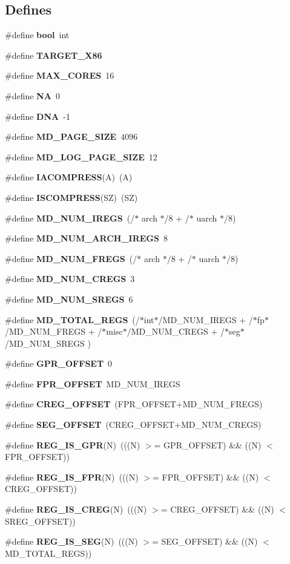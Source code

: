 \subsection*{Defines}
\begin{CompactItemize}
\item 
\#define {\bf bool}~int
\item 
\#define {\bf TARGET\_\-X86}
\item 
\#define {\bf MAX\_\-CORES}~16
\item 
\#define {\bf NA}~0
\item 
\#define {\bf DNA}~-1
\item 
\#define {\bf MD\_\-PAGE\_\-SIZE}~4096
\item 
\#define {\bf MD\_\-LOG\_\-PAGE\_\-SIZE}~12
\item 
\#define {\bf IACOMPRESS}(A)~(A)
\item 
\#define {\bf ISCOMPRESS}(SZ)~(SZ)
\item 
\#define {\bf MD\_\-NUM\_\-IREGS}~(/$\ast$ arch $\ast$/8 + /$\ast$ uarch $\ast$/8)
\item 
\#define {\bf MD\_\-NUM\_\-ARCH\_\-IREGS}~8
\item 
\#define {\bf MD\_\-NUM\_\-FREGS}~(/$\ast$ arch $\ast$/8 + /$\ast$ uarch $\ast$/8)
\item 
\#define {\bf MD\_\-NUM\_\-CREGS}~3
\item 
\#define {\bf MD\_\-NUM\_\-SREGS}~6
\item 
\#define {\bf MD\_\-TOTAL\_\-REGS}~(/$\ast$int$\ast$/MD\_\-NUM\_\-IREGS + /$\ast$fp$\ast$/MD\_\-NUM\_\-FREGS + /$\ast$misc$\ast$/MD\_\-NUM\_\-CREGS + /$\ast$seg$\ast$/MD\_\-NUM\_\-SREGS )
\item 
\#define {\bf GPR\_\-OFFSET}~0
\item 
\#define {\bf FPR\_\-OFFSET}~MD\_\-NUM\_\-IREGS
\item 
\#define {\bf CREG\_\-OFFSET}~(FPR\_\-OFFSET+MD\_\-NUM\_\-FREGS)
\item 
\#define {\bf SEG\_\-OFFSET}~(CREG\_\-OFFSET+MD\_\-NUM\_\-CREGS)
\item 
\#define {\bf REG\_\-IS\_\-GPR}(N)~(((N) $>$= GPR\_\-OFFSET) \&\& ((N) $<$ FPR\_\-OFFSET))
\item 
\#define {\bf REG\_\-IS\_\-FPR}(N)~(((N) $>$= FPR\_\-OFFSET) \&\& ((N) $<$ CREG\_\-OFFSET))
\item 
\#define {\bf REG\_\-IS\_\-CREG}(N)~(((N) $>$= CREG\_\-OFFSET) \&\& ((N) $<$ SREG\_\-OFFSET))
\item 
\#define {\bf REG\_\-IS\_\-SEG}(N)~(((N) $>$= SEG\_\-OFFSET) \&\& ((N) $<$ MD\_\-TOTAL\_\-REGS))

\end{CompactItemize}
